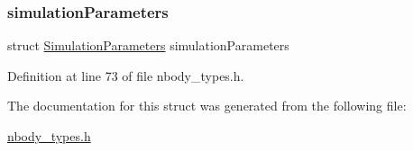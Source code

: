 \subsubsection{\texorpdfstring{simulation\+Parameters}{simulationParameters}}
{\footnotesize\ttfamily struct \hyperlink{struct_simulation_parameters}{Simulation\+Parameters} simulation\+Parameters}



Definition at line 73 of file nbody\+\_\+types.\+h.



The documentation for this struct was generated from the following file\+:\begin{DoxyCompactItemize}
\item 
\hyperlink{nbody__types_8h}{nbody\+\_\+types.\+h}\end{DoxyCompactItemize}
